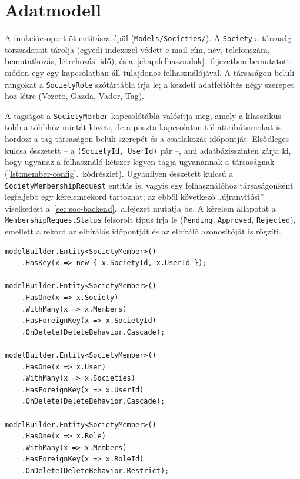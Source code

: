 \section{Adatmodell}
\label{sec:soc-adatmodell}

A funkciócsoport öt entitásra épül (\texttt{Models/Societies/}). A \texttt{Society} a társaság
törzsadatait tárolja (egyedi indexszel védett e-mail-cím, név, telefonszám, bemutatkozás,
létrehozási idő), és a~\ref{chap:felhasznalok}.~fejezetben bemutatott módon egy-egy kapcsolatban
áll tulajdonos felhasználójával. A társaságon belüli rangokat a \texttt{SocietyRole} szótártábla
írja le; a kezdeti adatfeltöltés négy szerepet hoz létre (Vezeto, Gazda, Vador, Tag).

A tagságot a \texttt{SocietyMember} kapcsolótábla valósítja meg, amely a klasszikus több-a-többhöz
mintát követi, de a puszta kapcsolaton túl attribútumokat is hordoz: a tag társaságon belüli
szerepét és a csatlakozás időpontját. Elsődleges kulcsa összetett -- a
\texttt{(SocietyId, UserId)} pár --, ami adatbázisszinten zárja ki, hogy ugyanaz a felhasználó
kétszer legyen tagja ugyanannak a társaságnak (\ref{lst:member-config}.~kódrészlet). Ugyanilyen
összetett kulcsú a \texttt{SocietyMembershipRequest} entitás is, vagyis egy felhasználóhoz
társaságonként legfeljebb egy kérelemrekord tartozhat; az ebből következő „újranyitási” viselkedést
a~\ref{sec:soc-backend}.~alfejezet mutatja be. A kérelem állapotát a
\texttt{MembershipRequestStatus} felsorolt típus írja le (\texttt{Pending}, \texttt{Approved},
\texttt{Rejected}), emellett a rekord az elbírálás időpontját és az elbíráló azonosítóját is
rögzíti.

\begin{lstlisting}[language={[Sharp]C}, caption={A tagsági kapcsolótábla konfigurációja a \texttt{HuntingContext} osztályban (kivonat)}, label={lst:member-config}]
modelBuilder.Entity<SocietyMember>()
    .HasKey(x => new { x.SocietyId, x.UserId });

modelBuilder.Entity<SocietyMember>()
    .HasOne(x => x.Society)
    .WithMany(x => x.Members)
    .HasForeignKey(x => x.SocietyId)
    .OnDelete(DeleteBehavior.Cascade);

modelBuilder.Entity<SocietyMember>()
    .HasOne(x => x.User)
    .WithMany(x => x.Societies)
    .HasForeignKey(x => x.UserId)
    .OnDelete(DeleteBehavior.Cascade);

modelBuilder.Entity<SocietyMember>()
    .HasOne(x => x.Role)
    .WithMany(x => x.Members)
    .HasForeignKey(x => x.RoleId)
    .OnDelete(DeleteBehavior.Restrict);
\end{lstlisting}

